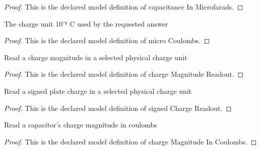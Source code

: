 \begin{proof}
  This is the declared model definition of capacitance In Microfarads.
\end{proof}
\begin{definition}
  \label{def:physics:phyx-mini-0879:phyxminiproblems-problemphyxmini0879-microcoulombs}
  The charge unit 10⁻⁶ C used by the requested answer
\end{definition}
\begin{proof}
  This is the declared model definition of micro Coulombs.
\end{proof}
\begin{definition}
  \label{def:physics:phyx-mini-0879:phyxminiproblems-problemphyxmini0879-chargemagnitudereadout}
  Read a charge magnitude in a selected physical charge unit
\end{definition}
\begin{proof}
  This is the declared model definition of charge Magnitude Readout.
\end{proof}
\begin{definition}
  \label{def:physics:phyx-mini-0879:phyxminiproblems-problemphyxmini0879-signedchargereadout}
  Read a signed plate charge in a selected physical charge unit
\end{definition}
\begin{proof}
  This is the declared model definition of signed Charge Readout.
\end{proof}
\begin{definition}
  \label{def:physics:phyx-mini-0879:phyxminiproblems-problemphyxmini0879-chargemagnitudeincoulombs}
  Read a capacitor's charge magnitude in coulombs
\end{definition}
\begin{proof}
  This is the declared model definition of charge Magnitude In Coulombs.
\end{proof}
